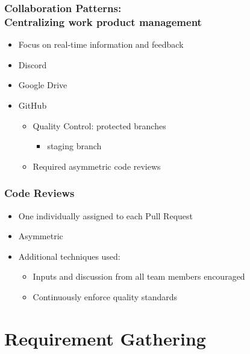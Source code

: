 \documentclass{beamer}
\begin{document}
\begin{frame}
\frametitle{Collaboration Patterns: \\ Centralizing work product management}
\begin{itemize}
 \item Focus on real-time information and feedback
 \item Discord
 \item Google Drive
 \item GitHub
  \begin{itemize}
   \item Quality Control: protected branches
     \begin{itemize}
        \item staging branch
    \end{itemize}
   \item Required asymmetric code reviews
  \end{itemize}
\end{itemize}
\end{frame}


\begin{frame}
\frametitle{Code Reviews}
 \begin{itemize}
  \item One individually assigned to each Pull Request
  \item Asymmetric
  \item Additional techniques used:
   \begin{itemize}
    \item Inputs and discussion from all team members encouraged
    \item Continuously enforce quality standards
   \end{itemize}
\end{itemize}
\end{frame}



\section{Requirement Gathering}
\end{document}
